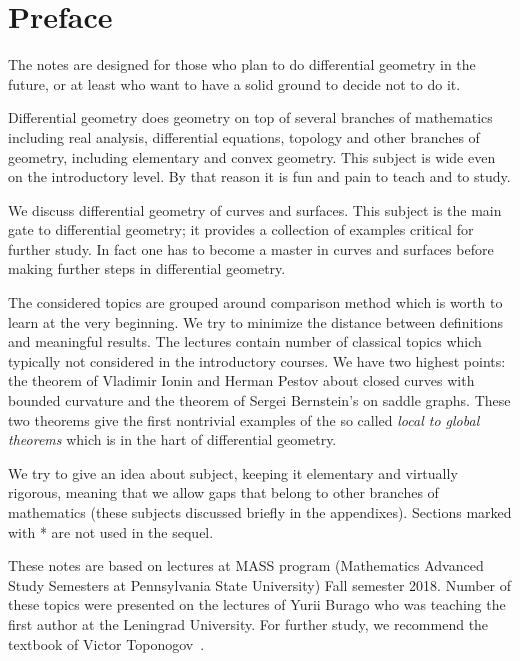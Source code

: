 
\chapter*{Preface}

The notes are designed for those who plan to do differential geometry in the future,
or at least who want to have a solid ground to decide not to do it.

Differential geometry does geometry on top of several branches of mathematics including real analysis, differential equations, topology and other branches of geometry, including elementary and convex geometry.
This subject is wide even on the introductory level. 
By that reason it is fun and pain to teach and to study.

We discuss differential geometry of curves and surfaces.
This subject is the main gate to differential geometry;
it provides a collection of examples critical for further study.
In fact one has to become a master in curves and surfaces before making further steps in differential geometry.

The considered topics are grouped around comparison method which is worth to learn at the very beginning.
We try to minimize the distance between definitions and meaningful results.
The lectures contain number of classical topics which typically not considered in the introductory courses.
We have two highest points: the theorem of Vladimir Ionin and Herman Pestov about closed curves with bounded curvature and the theorem of Sergei Bernstein's on saddle graphs.
These two theorems give the first nontrivial examples of the so called \emph{local to global theorems} which is in the hart of differential geometry.

We try to give an idea about subject, keeping it elementary and virtually rigorous, meaning that we allow gaps that belong to other branches of mathematics (these subjects discussed briefly in the appendixes).
Sections marked with * are not used in the sequel. 

These notes are based on lectures at MASS program (Mathematics Advanced Study Semesters at Pennsylvania State University) Fall semester 2018.
Number of these topics were presented on the lectures of Yurii Burago who was teaching the first author at the Leningrad University.
For further study, we recommend the textbook of Victor Toponogov~\cite{toponogov}.
